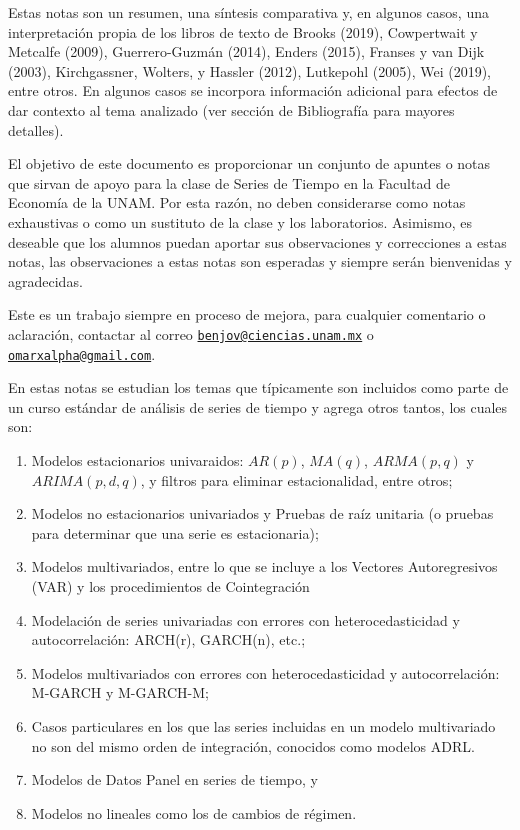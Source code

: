 \documentclass[
]{book}
\begin{document}
Estas notas son un resumen, una síntesis comparativa y, en algunos casos, una interpretación propia de los libros de texto de Brooks (2019), Cowpertwait y Metcalfe (2009), Guerrero-Guzmán (2014), Enders (2015), Franses y van Dijk (2003), Kirchgassner, Wolters, y Hassler (2012), Lutkepohl (2005), Wei (2019), entre otros. En algunos casos se incorpora información adicional para efectos de dar contexto al tema analizado (ver sección de Bibliografía para mayores detalles).

El objetivo de este documento es proporcionar un conjunto de apuntes o notas que sirvan de apoyo para la clase de Series de Tiempo en la Facultad de Economía de la UNAM. Por esta razón, no deben considerarse como notas exhaustivas o como un sustituto de la clase y los laboratorios. Asimismo, es deseable que los alumnos puedan aportar sus observaciones y correcciones a estas notas, las observaciones a estas notas son esperadas y siempre serán bienvenidas y agradecidas.

Este es un trabajo siempre en proceso de mejora, para cualquier comentario o aclaración, contactar al correo \href{mailto:benjov@ciencias.unam.mx}{\nolinkurl{benjov@ciencias.unam.mx}} o \href{mailto:omarxalpha@gmail.com}{\nolinkurl{omarxalpha@gmail.com}}.

En estas notas se estudian los temas que típicamente son incluidos como parte de un curso estándar de análisis de series de tiempo y agrega otros tantos, los cuales son:

\begin{enumerate}
\def\labelenumi{\arabic{enumi}.}
\item
  Modelos estacionarios univaraidos: \(AR(p)\), \(MA(q)\), \(ARMA(p, q)\) y \(ARIMA(p, d, q)\), y filtros para eliminar estacionalidad, entre otros;
\item
  Modelos no estacionarios univariados y Pruebas de raíz unitaria (o pruebas para determinar que una serie es estacionaria);
\item
  Modelos multivariados, entre lo que se incluye a los Vectores Autoregresivos (VAR) y los procedimientos de Cointegración
\item
  Modelación de series univariadas con errores con heterocedasticidad y autocorrelación: ARCH(r), GARCH(n), etc.;
\item
  Modelos multivariados con errores con heterocedasticidad y autocorrelación: M-GARCH y M-GARCH-M;
\item
  Casos particulares en los que las series incluidas en un modelo multivariado no son del mismo orden de integración, conocidos como modelos ADRL.
\item
  Modelos de Datos Panel en series de tiempo, y
\item
  Modelos no lineales como los de cambios de régimen.
\end{enumerate}
\end{document}

